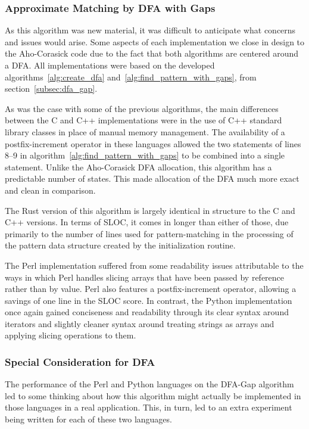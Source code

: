 \subsubsection{Approximate Matching by DFA with Gaps}

As this algorithm was new material, it was difficult to anticipate what concerns and issues would arise. Some aspects of each implementation we close in design to the Aho-Corasick code due to the fact that both algorithms are centered around a DFA. All implementations were based on the developed algorithms~\ref{alg:create_dfa} and~\ref{alg:find_pattern_with_gaps}, from section~\ref{subsec:dfa_gap}.

As was the case with some of the previous algorithms, the main differences between the C and C++ implementations were in the use of C++ standard library classes in place of manual memory management. The availability of a postfix-increment operator in these languages allowed the two statements of lines 8--9 in algorithm~\ref{alg:find_pattern_with_gaps} to be combined into a single statement. Unlike the Aho-Corasick DFA allocation, this algorithm has a predictable number of states. This made allocation of the DFA much more exact and clean in comparison.

The Rust version of this algorithm is largely identical in structure to the C and C++ versions. In terms of SLOC, it comes in longer than either of those, due primarily to the number of lines used for pattern-matching in the processing of the pattern data structure created by the initialization routine.

The Perl implementation suffered from some readability issues attributable to the ways in which Perl handles slicing arrays that have been passed by reference rather than by value. Perl also features a postfix-increment operator, allowing a savings of one line in the SLOC score. In contrast, the Python implementation once again gained conciseness and readability through its clear syntax around iterators and slightly cleaner syntax around treating strings as arrays and applying slicing operations to them.

\subsubsection{Special Consideration for DFA}
\label{subsubsec:dfa_regexp}

The performance of the Perl and Python languages on the DFA-Gap algorithm led to some thinking about how this algorithm might actually be implemented in those languages in a real application. This, in turn, led to an extra experiment being written for each of these two languages.

